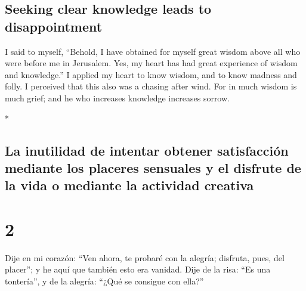\begin{paracol}{2}
\begin{otherlanguage}{english}
\hypertarget{seeking-clear-knowledge-leads-to-disappointment}{%
\subsection{Seeking clear knowledge leads to
disappointment}\label{seeking-clear-knowledge-leads-to-disappointment}}

 I said to myself, ``Behold, I have obtained for myself
great wisdom above all who were before me in Jerusalem. Yes, my heart
has had great experience of wisdom and knowledge.''  I
applied my heart to know wisdom, and to know madness and folly. I
perceived that this also was a chasing after wind.  For
in much wisdom is much grief; and he who increases knowledge increases
sorrow.

\end{otherlanguage}

\switchcolumn[0]*

\hypertarget{la-inutilidad-de-intentar-obtener-satisfacciuxf3n-mediante-los-placeres-sensuales-y-el-disfrute-de-la-vida-o-mediante-la-actividad-creativa}{%
\subsection{La inutilidad de intentar obtener satisfacción mediante los
placeres sensuales y el disfrute de la vida o mediante la actividad
creativa}\label{la-inutilidad-de-intentar-obtener-satisfacciuxf3n-mediante-los-placeres-sensuales-y-el-disfrute-de-la-vida-o-mediante-la-actividad-creativa}}

\hypertarget{section-2}{%
\section{2}\label{section-2}}

 Dije en mi corazón: ``Ven ahora, te probaré con la
alegría; disfruta, pues, del placer''; y he aquí que también esto era
vanidad.  Dije de la risa: ``Es una tontería'', y de la
alegría: ``¿Qué se consigue con ella?''


\end{paracol}
